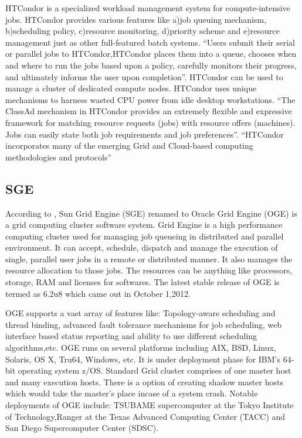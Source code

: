     
     HTCondor is a specialized workload management system for
     compute-intensive jobs.  HTCondor provides various features like
     a)job queuing mechanism, b)scheduling policy, c)resource
     monitoring, d)priority scheme and e)resource management just as
     other full-featured batch systems.  ``Users submit their serial or
     parallel jobs to HTCondor,HTCondor places them into a queue,
     chooses when and where to run the jobs based upon a policy,
     carefully monitors their progress, and ultimately informs the
     user upon completion''.  HTCondor can be used to manage a cluster
     of dedicated compute nodes. HTCondor uses unique mechanisms to
     harness wasted CPU power from idle desktop workstations. ``The
     ClassAd mechanism in HTCondor provides an extremely flexible and
     expressive framework for matching resource requests (jobs) with
     resource offers (machines).  Jobs can easily state both job
     requirements and job preferences''.  ``HTCondor incorporates many
     of the emerging Grid and Cloud-based computing methodologies and
     protocols'' \cite{htcondor}

     
\subsection{ SGE}

     According to \cite{www-sge-wiki}, Sun Grid Engine (SGE) renamed
     to Oracle Grid Engine (OGE) is a grid computing cluster software
     system. Grid Engine is a high performance computing cluster used
     for managing job queueing in distributed and parallel
     environment. It can accept, schedule, dispatch and manage the
     execution of single, parallel user jobs in a remote or
     distributed manner. It also manages the resource allocation to
     those jobs. The resources can be anything like processors,
     storage, RAM and licenses for softwares. The latest stable
     release of OGE is termed as 6.2u8 which came out in October
     1,2012.

     OGE supports a vast array of features like: Topology-aware
     scheduling and thread binding, advanced fault tolerance
     mechanisms for job scheduling, web interface based status
     reporting and ability to use different scheduling
     algorithms,etc. OGE runs on several platforms including AIX, BSD,
     Linux, Solaris, OS X, Tru64, Windows, etc. It is under deployment
     phase for IBM's 64-bit operating system z/OS. Standard Grid
     cluster comprises of one master host and many execution
     hosts. There is a option of creating shadow master hosts which
     would take the master's place incase of a system crash. Notable
     deployments of OGE include: TSUBAME supercomputer at the Tokyo
     Institute of Technology,Ranger at the Texas Advanced Computing
     Center (TACC) and San Diego Supercomputer Center (SDSC).

